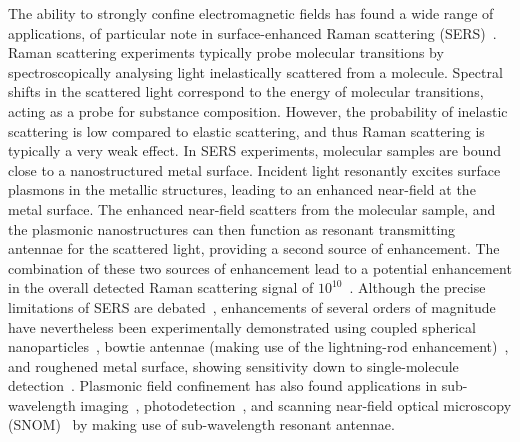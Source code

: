 The ability to strongly confine electromagnetic fields has found a wide range of applications, of particular note in surface-enhanced Raman scattering (SERS)~\cite{Nie1997, Petryayeva2011a}. Raman scattering experiments typically probe molecular transitions by spectroscopically analysing light inelastically scattered from a molecule. Spectral shifts in the scattered light correspond to the energy of molecular transitions, acting as a probe for substance composition. However, the probability of inelastic scattering is low compared to elastic scattering, and thus Raman scattering is typically a very weak effect. In SERS experiments, molecular samples are bound close to a nanostructured metal surface. Incident light resonantly excites surface plasmons in the metallic structures, leading to an enhanced near-field at the metal surface. The enhanced near-field scatters from the molecular sample, and the plasmonic nanostructures can then function as resonant transmitting antennae for the scattered light, providing a second source of enhancement. The combination of these two sources of enhancement lead to a potential enhancement in the overall detected Raman scattering signal of $10^{10}$~\cite{Fromm2006}. Although the precise limitations of SERS are debated~\cite{LeRu2007}, enhancements of several orders of magnitude have nevertheless been experimentally demonstrated using coupled spherical nanoparticles~\cite{Talley2005}, bowtie antennae (making use of the lightning-rod enhancement)~\cite{Fromm2006}, and roughened metal surface, showing sensitivity down to single-molecule detection~\cite{Blackie2009}. Plasmonic field confinement has also found applications in sub-wavelength imaging~\cite{Huang2010a}, photodetection~\cite{Ishi2005}, and scanning near-field optical microscopy (SNOM)~\cite{Wenzel2008} by making use of sub-wavelength resonant antennae.

